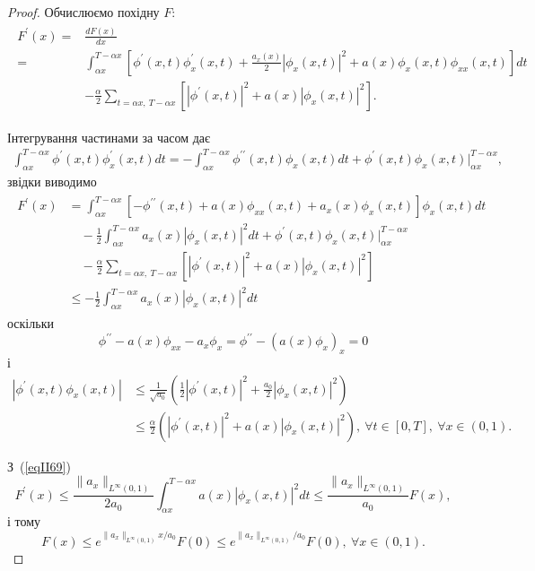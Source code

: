 \begin{proof}
Обчислюємо похідну $F$:
\begin{align}\label{eqII68}
\begin{split}
F^\prime(x) = &\frac{dF(x)}{dx}
\\  = &\int_{\alpha x}^{T-\alpha x} \left[\phi^\prime(x,t) \phi_x^\prime(x,t)  + \frac{a_x(x)}{2}|\phi_x(x,t)|^2 + a(x) \phi_x(x,t) \phi_{xx}(x,t)\right]dt
\\ & -\frac{\alpha}{2} \sum_{t=\alpha x,\ T-\alpha x} \left[|\phi^\prime(x,t)|^2 + a(x)|\phi_x(x,t)|^2\right].
\end{split}
\end{align}

Інтегрування частинами за часом дає
\begin{eqnarray*}
\int_{\alpha x}^{T-\alpha x} \phi^\prime(x,t) \phi_x^\prime(x,t) dt = - \int_{\alpha x}^{T-\alpha x} \phi^{\prime\prime}(x,t) \phi_x(x,t) dt + \phi^\prime(x,t) \phi_x(x,t) \bigg|^{T-\alpha x}_{\alpha x},
\end{eqnarray*}
звідки виводимо
\begin{align}\label{eqII69}
\begin{split}
F^\prime(x) & = \int_{\alpha x}^{T-\alpha x} \left[- \phi^{\prime\prime}(x,t) + a(x) \phi_{xx}(x,t) + a_x(x) \phi_x(x,t)\right] \phi_x(x,t) dt
\\ & \quad -\frac{1}{2} \int_{\alpha x}^{T-\alpha x} a_x(x) \left|\phi_x(x,t)\right|^2 dt + \phi^\prime(x,t) \phi_x(x,t) \bigg|^{T-\alpha x}_{\alpha x}
\\ & \quad -\frac{\alpha}{2} \sum_{t=\alpha x,\ T-\alpha x} \left[|\phi^\prime(x,t)|^2 + a(x)|\phi_x(x,t)|^2\right]
\\ & \leq -\frac{1}{2} \int_{\alpha x}^{T-\alpha x} a_x(x) \left|\phi_x(x,t)\right|^2 dt
\end{split}
\end{align}
 оскільки
\begin{equation*}
    \phi^{\prime \prime} - a(x) \phi_{xx} - a_x \phi_x = \phi^{\prime \prime} - (a(x) \phi_x)_x = 0
\end{equation*}
і
\begin{align*}
\left|\phi^\prime(x,t) \phi_x(x,t)\right| &\leq \frac{1}{\sqrt{a_0}} \left(\frac{1}{2}|\phi^\prime(x,t)|^2 + \frac{a_0}{2}|\phi_x(x,t)|^2\right)
\\ &\leq \frac{\alpha}{2} \left(|\phi^\prime(x,t)|^2 + a(x)|\phi_x(x,t)|^2\right),\ \forall t \in [0,T],\ \forall x \in (0,1).
\end{align*}

З~(\ref{eqII69})
\begin{equation} \label{eqII70}
    F^\prime(x) \leq \frac{\|a_x\|_{L^\infty(0,1)}}{2a_0} \int_{\alpha x}^{T-\alpha x} a(x) |\phi_x(x,t)|^2 dt \leq  \frac{\|a_x\|_{L^\infty(0,1)}}{a_0} F(x),
\end{equation}
і тому
\begin{equation} \label{eqII71}
    F(x) \leq e^{\|a_x\|_{L^\infty(0,1)} x/a_0}   F(0) \leq e^{\|a_x\|_{L^\infty(0,1)}/a_0} F(0),\ \forall x \in (0,1).
\end{equation}


\end{proof}
